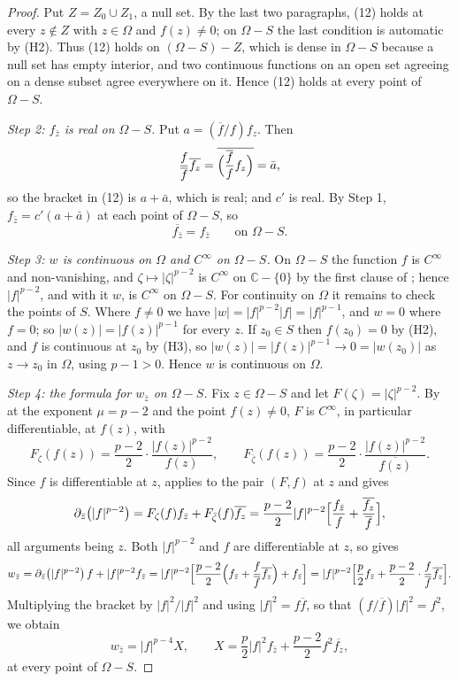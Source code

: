 \begin{proof}
Put $Z=Z_0\cup Z_1$, a null set.  By the last two paragraphs, (12) holds at
every $z\notin Z$ with $z\in\Omega$
and $f(z)\neq0$; on $\Omega-S$ the last condition is automatic by (H2).  Thus
(12) holds on $(\Omega-S)-Z$, which is dense in $\Omega-S$ because a null set
has empty interior, and two continuous functions on an open set agreeing on a
dense subset agree everywhere on it.  Hence (12) holds at every point of
$\Omega-S$.

\emph{Step 2: $f_{\bar z}$ is real on $\Omega-S$.}  Put $a=(\overline{f}/f)f_z$.
Then
\[
  \frac{f}{\overline{f}}\overline{f_z}
  =\overline{\Bigl(\frac{\overline{f}}{f}f_z\Bigr)}=\bar a ,
\]
so the bracket in (12) is $a+\bar a$, which is real; and $c'$ is real.  By
Step 1, $f_{\bar z}=c'(a+\bar a)$ at each point of $\Omega-S$, so
\begin{equation}\tag{1}
  \overline{f_{\bar z}}=f_{\bar z}\qquad\text{on }\Omega-S .
\end{equation}

\emph{Step 3: $w$ is continuous on $\Omega$ and $C^\infty$ on $\Omega-S$.}  On
$\Omega-S$ the function $f$ is $C^\infty$ and non-vanishing, and
$\zeta\mapsto|\zeta|^{p-2}$ is $C^\infty$ on $\mathbb{C}-\{0\}$ by the first
clause of ; hence $|f|^{p-2}$, and with it
$w$, is $C^\infty$ on $\Omega-S$.  For continuity on $\Omega$ it remains to
check the points of $S$.  Where $f\neq0$ we have
$|w|=|f|^{p-2}|f|=|f|^{p-1}$, and $w=0$ where $f=0$; so
$|w(z)|=|f(z)|^{p-1}$ for every $z$.  If $z_0\in S$ then $f(z_0)=0$ by (H2),
and $f$ is continuous at $z_0$ by (H3), so $|w(z)|=|f(z)|^{p-1}\to0=|w(z_0)|$
as $z\to z_0$ in $\Omega$, using $p-1>0$.  Hence $w$ is continuous on $\Omega$.

\emph{Step 4: the formula for $w_{\bar z}$ on $\Omega-S$.}  Fix $z\in\Omega-S$ and
let $F(\zeta)=|\zeta|^{p-2}$.  By  at the
exponent $\mu=p-2$ and the point $f(z)\neq0$, $F$ is $C^\infty$, in particular
differentiable, at $f(z)$, with
\[
  F_\zeta(f(z))=\frac{p-2}{2}\cdot\frac{|f(z)|^{p-2}}{f(z)},\qquad
  F_{\bar\zeta}(f(z))=\frac{p-2}{2}\cdot\frac{|f(z)|^{p-2}}
    {\overline{f(z)}} .
\]
Since $f$ is differentiable at $z$,  applies to the
pair $(F,f)$ at $z$ and gives
\[
  \partial_{\bar z}\bigl(|f|^{p-2}\bigr)
  =F_\zeta(f)f_{\bar z}+F_{\bar\zeta}(f)\overline{f_z}
  =\frac{p-2}{2}|f|^{p-2}\Bigl[\frac{f_{\bar z}}{f}
    +\frac{\overline{f_z}}{\overline{f}}\Bigr],
\]
all arguments being $z$.  Both $|f|^{p-2}$ and $f$ are differentiable at $z$,
so  gives
\[
  w_{\bar z}=\partial_{\bar z}\bigl(|f|^{p-2}\bigr)\,f+|f|^{p-2}f_{\bar z}
  =|f|^{p-2}\Bigl[\frac{p-2}{2}\Bigl(f_{\bar z}
    +\frac{f}{\overline{f}}\overline{f_z}\Bigr)+f_{\bar z}\Bigr]
  =|f|^{p-2}\Bigl[\frac{p}{2}f_{\bar z}
    +\frac{p-2}{2}\cdot\frac{f}{\overline{f}}\overline{f_z}\Bigr].
\]
Multiplying the bracket by $|f|^2/|f|^2$ and using
$|f|^2=f\overline{f}$, so that $(f/\overline{f})|f|^2=f^2$, we obtain
\begin{equation}\tag{2}
  w_{\bar z}=|f|^{p-4}X,\qquad
  X=\frac p2|f|^2f_{\bar z}+\frac{p-2}{2}f^2\overline{f_z},
\end{equation}
at every point of $\Omega-S$.


\end{proof}

